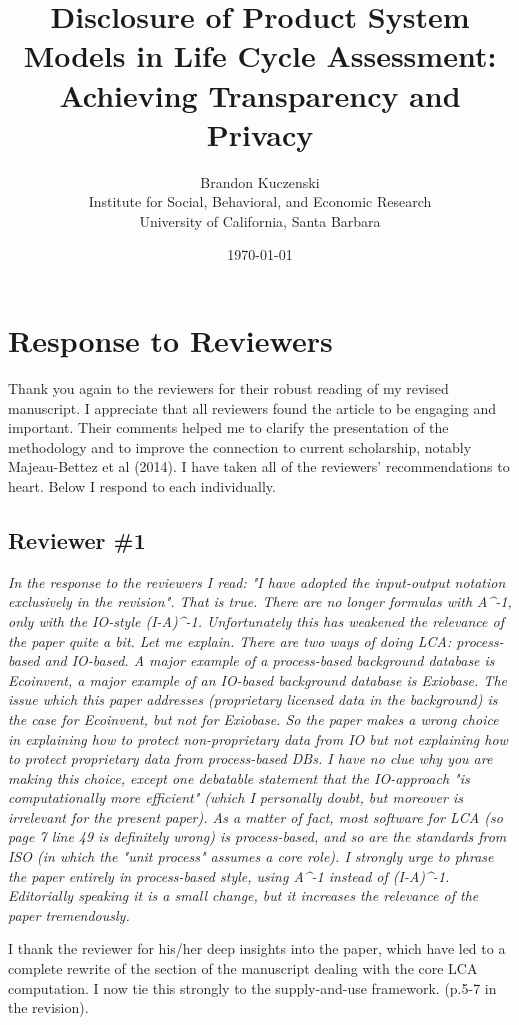 \documentclass[11pt,letterpaper]{article}
\title{Disclosure of Product System Models in Life Cycle Assessment: Achieving Transparency and Privacy}
\author{Brandon Kuczenski\\
Institute for Social, Behavioral, and Economic Research\\
University of California, Santa Barbara}
\date{\mydate\today}
\begin{document}
\maketitle

\section*{Response to Reviewers}

Thank you again to the reviewers for their robust reading of my revised manuscript.  I appreciate that all reviewers found the article to be engaging and important.  Their comments helped me to clarify the presentation of the methodology and to improve the connection to current scholarship, notably Majeau-Bettez et al (2014).  I have taken all of the reviewers' recommendations to heart.  Below I respond to each individually.

\subsection*{Reviewer \#1}

\emph{In the response to the reviewers I read: "I have adopted the input-output notation exclusively in the revision". That is true. There are no longer formulas with A^-1, only with the IO-style (I-A)^-1. Unfortunately this has weakened the relevance of the paper quite a bit. Let me explain. There are two ways of doing LCA: process-based and IO-based.  A major example of a process-based background database is Ecoinvent, a major example of an IO-based background database is Exiobase. The issue which this paper addresses (proprietary licensed data in the background) is the case for Ecoinvent, but not for Exiobase. So the paper makes a wrong choice in explaining how to protect non-proprietary data from IO but not explaining how to protect proprietary data from process-based DBs. I have no clue why you are making this choice, except one debatable statement that the IO-approach "is computationally more efficient" (which I personally doubt, but moreover is irrelevant for the present paper). As a matter of fact, most software for LCA (so page 7 line 49 is definitely wrong) is process-based, and so are the standards from ISO (in which the "unit process" assumes a core role). I strongly urge to phrase the paper entirely in process-based style, using A^-1 instead of (I-A)^-1. Editorially speaking it is a small change, but it increases the relevance of the paper tremendously.}

I thank the reviewer for his/her deep insights into the paper, which have led to a complete rewrite of the section of the manuscript dealing with the core LCA computation.  I now tie this strongly to the supply-and-use framework. (p.5-7 in the revision).
\end{document}
